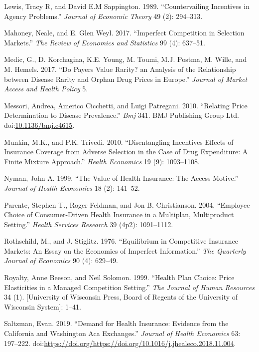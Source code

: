 \documentclass[a4paper,12pt]{article}
\begin{document}
\hypertarget{citeproc_bib_item_27}{Lewis, Tracy R, and David E.M Sappington. 1989. “Countervailing Incentives in Agency Problems.” \textit{Journal of Economic Theory} 49 (2): 294–313.}

\hypertarget{citeproc_bib_item_28}{Mahoney, Neale, and E. Glen Weyl. 2017. “Imperfect Competition in Selection Markets.” \textit{The Review of Economics and Statistics} 99 (4): 637–51.}

\hypertarget{citeproc_bib_item_29}{Medic, G., D. Korchagina, K.E. Young, M. Toumi, M.J. Postma, M. Wille, and M. Hemels. 2017. “Do Payers Value Rarity? an Analysis of the Relationship between Disease Rarity and Orphan Drug Prices in Europe.” \textit{Journal of Market Access and Health Policy} 5.}

\hypertarget{citeproc_bib_item_30}{Messori, Andrea, Americo Cicchetti, and Luigi Patregani. 2010. “Relating Price Determination to Disease Prevalence.” \textit{Bmj} 341. BMJ Publishing Group Ltd. doi:\href{https://doi.org/10.1136/bmj.c4615}{10.1136/bmj.c4615}.}

\hypertarget{citeproc_bib_item_31}{Munkin, M.K., and P.K. Trivedi. 2010. “Disentangling Incentives Effects of Insurance Coverage from Adverse Selection in the Case of Drug Expenditure: A Finite Mixture Approach.” \textit{Health Economics} 19 (9): 1093–1108.}

\hypertarget{citeproc_bib_item_32}{Nyman, John A. 1999. “The Value of Health Insurance: The Access Motive.” \textit{Journal of Health Economics} 18 (2): 141–52.}

\hypertarget{citeproc_bib_item_33}{Parente, Stephen T., Roger Feldman, and Jon B. Christianson. 2004. “Employee Choice of Consumer-Driven Health Insurance in a Multiplan, Multiproduct Setting.” \textit{Health Services Research} 39 (4p2): 1091–1112.}

\hypertarget{citeproc_bib_item_34}{Rothschild, M., and J. Stiglitz. 1976. “Equilibrium in Competitive Insurance Markets: An Essay on the Economics of Imperfect Information.” \textit{The Quarterly Journal of Economics} 90 (4): 629–49.}

\hypertarget{citeproc_bib_item_35}{Royalty, Anne Beeson, and Neil Solomon. 1999. “Health Plan Choice: Price Elasticities in a Managed Competition Setting.” \textit{The Journal of Human Resources} 34 (1). [University of Wisconsin Press, Board of Regents of the University of Wisconsin System]: 1–41.}

\hypertarget{citeproc_bib_item_36}{Saltzman, Evan. 2019. “Demand for Health Insurance: Evidence from the California and Washington Aca Exchanges.” \textit{Journal of Health Economics} 63: 197–222. doi:\url{https://doi.org/https://doi.org/10.1016/j.jhealeco.2018.11.004}.}
\end{document}
